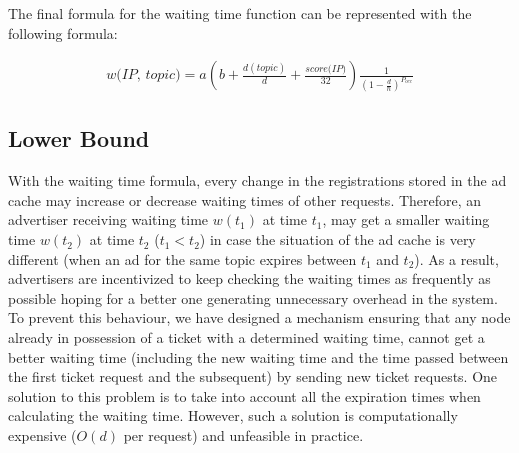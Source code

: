 The final formula for the waiting time function can be represented with  the following formula:%

\begin{equation}
\begin{split}
    \textit{w(IP, topic)} = 
    a(b + \frac{d(topic)}{d} + \frac{\textit{score(IP)}}{32}
    )
    \frac{1}{(1-\frac{d}{n})^{P_\textit{occ}}}
\end{split}
\end{equation}



\subsection{Lower Bound}
With the waiting time formula, every change in the registrations stored in  the ad cache may increase or decrease waiting times of other requests. 
Therefore,  an advertiser receiving waiting time $w(t_1)$ at time $t_1$, may get a smaller waiting time $w(t_2)$ at time $t_2$ ($t_1 < t_2$) in case the situation of the ad cache is very different (\eg when an ad for the same topic expires between $t_1$ and $t_2$). 
As a result, advertisers are incentivized to keep checking the waiting times as frequently as possible hoping for a better one generating unnecessary overhead in the system.
To prevent this behaviour, we have designed a mechanism ensuring that any node already in possession of a ticket with a determined waiting time, cannot get a better waiting time (including the new waiting time and the time passed between the first ticket request and the subsequent) by sending new ticket requests.
One solution to this problem is to take into account all the expiration times when calculating the waiting time. 
However, such a solution is computationally expensive (\eg $O(d)$ per request) and unfeasible in practice.

